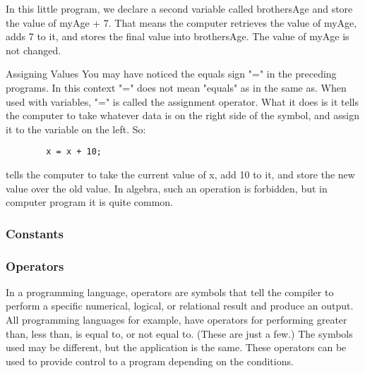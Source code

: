 In this little program, we declare a second variable called brothersAge and store the value of myAge + 7. That means the computer retrieves the value of myAge, adds 7 to it, and stores the final value into brothersAge. The value of myAge is not changed.

	\begin{positiveInformation}{Assigning Values}
	You may have noticed the equals sign "=" in the preceding programs. In this context "=" does not mean "equals" as in the same as. When used with variables, "=" is called the assignment operator. What it does is it tells the computer to take whatever data is on the right side of the symbol, and assign it to the variable on the left. So:
		\begin{verbatim}
		x = x + 10;
		\end{verbatim}
		tells the computer to take the current value of x, add 10 to it, and store the new value over the old value. In algebra, such an operation is forbidden, but in computer program it is quite common.
	\end{positiveInformation}	
\subsubsection*{Constants}
\subsubsection*{Operators}
In a programming language, operators are symbols that tell the compiler to perform a specific numerical, logical, or relational result and produce an output. All programming languages for example, have operators for performing greater than, less than, is equal to, or not equal to. (These are just a few.) The symbols used may be different, but the application is the same. These operators can be used to provide control to a program depending on the conditions.

